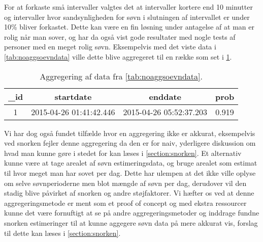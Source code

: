 For at forkaste små intervaller valgtes det at intervaller kortere end 10 minutter og intervaller hvor sandsynligheden for søvn i slutningen af intervallet er under 10\% bliver forkastet.
Dette kan være en fin løsning under antagelse af at man er rolig når man sover, og har da også vist gode resultater med nogle tests af personer med en meget rolig søvn. 
Eksempelvis med det viste data i \cref{tab:noaggsoevndata} ville dette blive aggregeret til en række som set i \cref{tab:aggdat}.

\begin{table}[h]
	\centering
\begin{tabular}{|c|c|c|c|}
	\hline {\_}id & startdate & enddate & prob \\ 
	\hline 1 & 2015-04-26 01:41:42.446 &  2015-04-26 05:52:37.203 & 0.919 \\ 
	\hline 
\end{tabular} 
\caption{Aggregering af data fra \cref{tab:noaggsoevndata}.}\label{tab:aggdat}
\end{table}

Vi har dog også fundet tilfælde hvor en aggregering ikke er akkurat, eksempelvis ved snorken fejler denne aggregering da den er for naiv, yderligere diskussion om hvad man kunne gøre i stedet for kan læses i \cref{section:snorken}.
Et alternativ kunne være at tage arealet af søvn estimeringsdata, og bruge arealet som estimat til hvor meget man har sovet per dag.
Dette har ulempen at det ikke ville oplyse om selve søvnperioderne men blot mængde af søvn per dag, derudover vil den stadig blive påvirket af snorken og andre støjfaktorer.
Vi hæfter os ved at denne aggregeringsmetode er ment som et proof of concept og med ekstra ressourcer kunne det være fornuftigt at se på andre aggregeringsmetoder og inddrage fundne snorken estimeringer til at kunne aggegere søvn data på mere akkurat vis, forslag til dette kan læses i \cref{section:snorken}.




